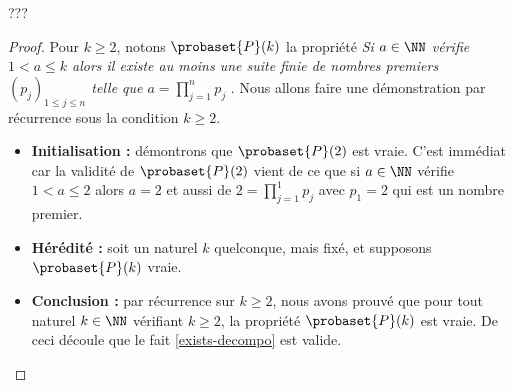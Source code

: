 ??? 


\begin{proof}
	Pour $k \geq 2$, notons $\probaset{P}(k)$ la propriété \emph{\og Si $a \in \NN$ vérifie $1 < a \leq k$ alors il existe au moins une suite finie de nombres premiers $(p_j)_{1 \leq j \leq n}$ telle que $\displaystyle a = \prod_{j=1}^{n} p_j$ \fg}. Nous allons faire une démonstration par récurrence sous la condition $k \geq 2$.
	
	\begin{itemize}[label=\small\textbullet]
		\medskip
		\item \textbf{Initialisation :} démontrons que $\probaset{P}(2)$ est vraie. C'est immédiat car la validité de $\probaset{P}(2)$ vient de ce que si $a \in \NN$ vérifie $1 < a \leq 2$ alors $a = 2$ et aussi de $\displaystyle 2 = \prod_{j=1}^{1} p_j$ avec $p_1 = 2$ qui est un nombre premier. 


		\medskip
		\item \textbf{Hérédité :} soit un naturel $k$ quelconque, mais fixé, et supposons $\probaset{P}(k)$ vraie. 


		\medskip
		\item \textbf{Conclusion :} par récurrence sur $k \geq 2$, nous avons prouvé que pour tout naturel $k \in \NN$ vérifiant $k \geq 2$, la propriété $\probaset{P}(k)$ est vraie.
		De ceci découle que le fait \ref{exists-decompo} est valide.
	\end{itemize}
\end{proof}